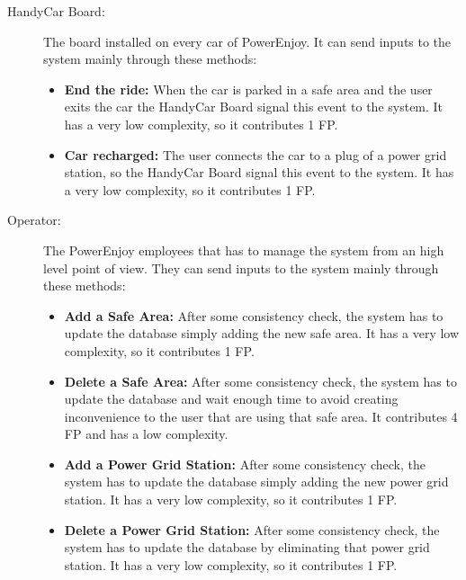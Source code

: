 \begin{description}
	\item[HandyCar Board:] The board installed on every car of PowerEnjoy. It can send inputs to the system mainly through these methods: 
	\begin{itemize}
	\item\textbf{End the ride:} When the car is parked in a safe area and the user exits the car the HandyCar Board signal this event to the system. It has a very low complexity, so it contributes 1 FP.
	\item\textbf{Car recharged:} The user connects the car to a plug of a power grid station, so the HandyCar Board signal this event to the system. It has a very low complexity, so it contributes 1 FP.
	\end{itemize}
	
	\item[Operator:] The PowerEnjoy employees that has to manage the system from an high level point of view. They can send inputs to the system mainly through these methods: 
	\begin{itemize}
	\item\textbf{Add a Safe Area:} After some consistency check, the system has to update the database simply adding the new safe area. It has a very low complexity, so it contributes 1 FP.
	\item\textbf{Delete a Safe Area:} After some consistency check, the system has to update the database and wait enough time to avoid creating inconvenience to the user that are using that safe area. It contributes 4 FP and has a low complexity.
	\item\textbf{Add a Power Grid Station:} After some consistency check, the system has to update the database simply adding the new power grid station. It has a very low complexity, so it contributes 1 FP.
	\item\textbf{Delete a Power Grid Station:} After some consistency check, the system has to update the database by eliminating that power grid station. It has a very low complexity, so it contributes 1 FP.
	\end{itemize}
	
\end{description}

